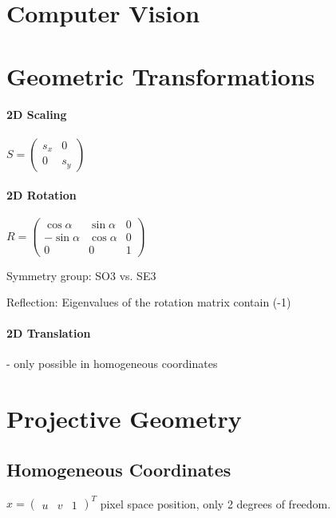 \section{Computer Vision}

\section{Geometric Transformations}

\paragraph{2D Scaling}

$S = \left( \begin{matrix} s_x & 0 \\ 0 & s_y  \end{matrix} \right)$

\paragraph{2D Rotation}

$R = \left(\begin{matrix} \cos  \alpha & \sin \alpha  & 0 \\  -\sin \alpha & \cos \alpha & 0 \\ 0 & 0 & 1  \end{matrix} \right)$

Symmetry group: SO3 vs. SE3

Reflection: Eigenvalues of the rotation matrix contain (-1)

\paragraph{2D Translation} - only possible in homogeneous coordinates

\section{Projective Geometry}

\subsection{Homogeneous Coordinates}

$x = \left(\begin{matrix} u & v & 1 \end{matrix}\right)^T$ pixel space position, only 2 degrees of freedom.

